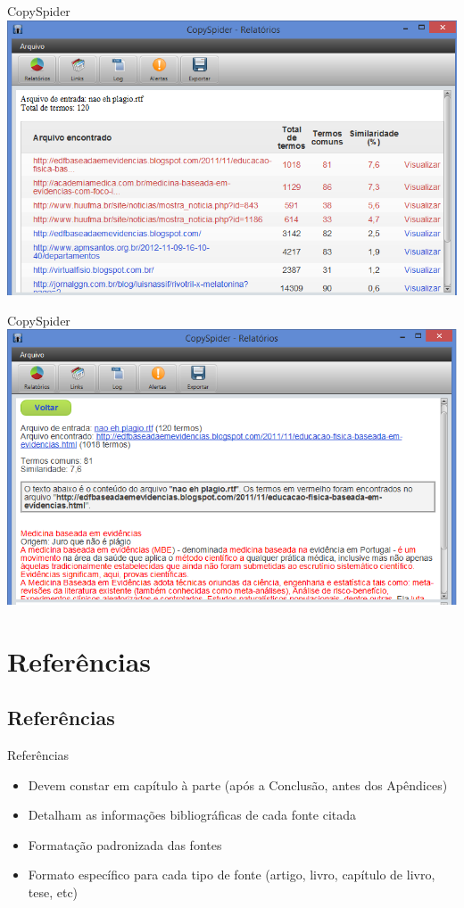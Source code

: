\documentclass{beamer}
\begin{document}
\begin{frame}{CopySpider}
  \centering
  \includegraphics[width=\textwidth]{Referencias/copyspider3}
\end{frame}

\begin{frame}{CopySpider}
  \centering
  \includegraphics[width=\textwidth]{Referencias/copyspider4}
\end{frame}

\section{Referências}

\subsection{Referências}

\begin{frame}{Referências}
  \begin{itemize}
    \footnotesize
  \item Devem constar em capítulo à parte (após a Conclusão, antes dos
    Apêndices)
  \item Detalham as informações bibliográficas de cada fonte citada
  \item Formatação padronizada das fontes
  \item Formato específico para cada tipo de fonte (artigo, livro,
    capítulo de livro, tese, etc)
  \end{itemize}
\end{frame}
\end{document}
